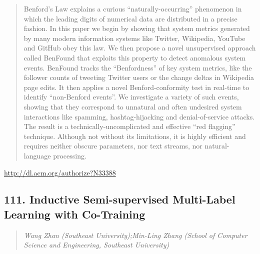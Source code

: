 \documentclass{article}
\begin{document}
\begin{quote}
Benford’s Law explains a curious “naturally-occurring” phenomenon in which the leading digits of numerical data are distributed in a precise fashion. In this paper we begin by showing that system metrics generated by many modern information systems like Twitter, Wikipedia, YouTube and GitHub obey this law. We then propose a novel unsupervised approach called BenFound that exploits this property to detect anomalous system events. BenFound tracks the “Benfordness” of key system metrics, like the follower counts of tweeting Twitter users or the change deltas in Wikipedia page edits. It then applies a novel Benford-conformity test in real-time to identify “non-Benford events”. We investigate a variety of such events, showing that they correspond to unnatural and often undesired system interactions like spamming, hashtag-hijacking and denial-of-service attacks. The result is a technically-uncomplicated and effective “red flagging” technique. Although not without its limitations, it is highly efficient and requires neither obscure parameters, nor text streams, nor natural-language processing.
\end{quote}

\href{http://dl.acm.org/authorize?N33388}{http://dl.acm.org/authorize?N33388}

\subsection{111. Inductive Semi-supervised Multi-Label Learning with Co-Training}

\begin{quote}
\footnotesize{\textit{Wang Zhan (Southeast University);Min-Ling Zhang (School of Computer Science and Engineering, Southeast University)}}

\end{quote}
\end{document}
